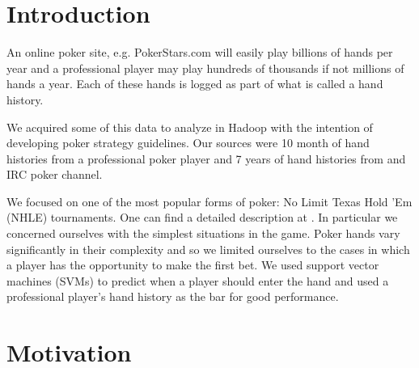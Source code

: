 \documentclass[twoside]{article}
\begin{document}
\begin{multicols}{2} %

\section{Introduction}
An online poker site, e.g. PokerStars.com will easily play billions of hands per year and a professional player may play hundreds of thousands if not millions of hands a year. Each of these hands is logged as part of what is called a hand history.

We acquired some of this data to analyze in Hadoop with the intention of developing poker strategy guidelines. Our sources were 10 month of hand histories from a professional poker player and 7 years of hand histories from and IRC poker channel. 

We focused on one of the most popular forms of poker: No Limit Texas Hold 'Em (NHLE) tournaments. One can find a detailed description at \cite{texashold'em}. In particular we concerned ourselves with the simplest situations in the game. Poker hands vary significantly in their complexity and so we limited ourselves to the cases in which a player has the opportunity to make the first bet. We used support vector machines (SVMs) to predict when a player should enter the hand and used a professional player's hand history as the bar for good performance.




\section{Motivation}


\end{multicols}
\end{document}
